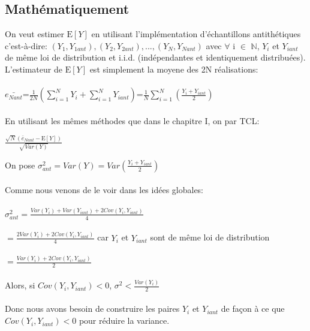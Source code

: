 \documentclass[12pt]{report}
\begin{document}
\subsection{Mathématiquement}
On veut estimer $\text{E}[Y]$ en utilisant l'implémentation d'échantillons antithétiques c'est-à-dire: $(Y_1,Y_{1ant}),(Y_2,Y_{2ant}),...,(Y_N,Y_{Nant})$  avec $\forall$ i $\in$ $\mathbb{N}$, $Y_i$ et $Y_{iant}$ de même loi de distribution et i.i.d. (indépendantes et identiquement distribuées).\\
L'estimateur de $\text{E}[Y]$ est simplement la moyene des 2N réalisations:\\\\
$\bar{e_{Nant}}$=$\frac{1}{2N}(\sum_{i=1}^{N}Y_i +\sum_{i=1}^{N}Y_{iant})$=$\frac{1}{N}\sum_{i=1}^{N}(\frac{Y_i+Y_{iant}}{2})$\\\\
En utilisant les mêmes méthodes que dans le chapitre I, on par TCL:\\
\begin{center}
	$\frac{\sqrt{N}(\bar{e}_{Nant}-\text{E}[Y])}{\sqrt{Var(Y)}}$
\end{center}
On pose $\sigma^2_{ant}=Var(Y)=Var(\frac{Y_i+Y_{iant}}{2})$\\\\
Comme nous venons de le voir dans les idées globales:\\\\
$\sigma^2_{ant}=\frac{Var(Y_i)+Var(Y_{iant})+2Cov(Y_i,Y_{iant})}{4}$\\\\
$ =\frac{2Var(Y_i)+2Cov(Y_i,Y_{iant})}{4}$ car $Y_i $ et $ Y_{iant}$ sont de même loi de distribution\\\\
$=\frac{Var(Y_i)+2Cov(Y_i,Y_{iant})}{2}$\\\\
Alors, si $Cov(Y_i,Y_{iant}) <0$, $\sigma^2<\frac{Var(Y_i)}{2}$\\\\
Donc nous avons besoin de construire les paires $Y_i$ et $Y_{iant}$ de façon à ce que $Cov(Y_i,Y_{iant}) <0$ pour réduire la variance.\\\\
\end{document}

